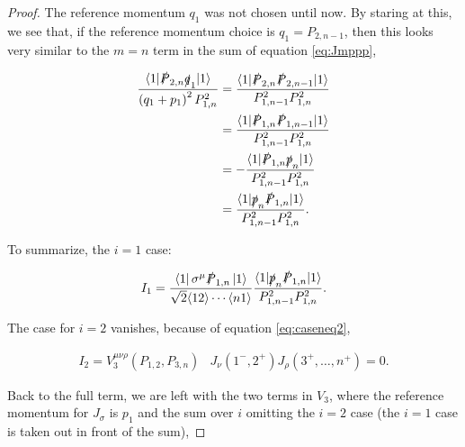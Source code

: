 \documentclass{article}
\theoremstyle{definition}
\numberwithin{equation}{section}
\begin{document}
\begin{proof}
    The reference momentum $q_1$ was not chosen until now. By staring at this, we see that, if the reference momentum choice is $q_1 = P_{2,n-1}$, then this looks very similar to the $m=n$ term in the sum of equation \eqref{eq:Jmppp},

    \begin{align*}
        \frac{ \langle 1 | \slashed{P}_{2,n} \slashed{q}_1 | 1 \rangle }{ \left( q_1 + p_1 \right)^2 P_{1,n}^2 } &= \frac{ \langle 1 | \slashed{P}_{2,n} \slashed{P}_{2,n-1} | 1 \rangle }{ P_{1,n-1}^2 P_{1,n}^2 } \\
        &= \frac{ \langle 1 | \slashed{P}_{1,n} \slashed{P}_{1,n-1} | 1 \rangle }{ P_{1,n-1}^2 P_{1,n}^2 } \\
        &= - \frac{ \langle 1 | \slashed{P}_{1,n} \slashed{p}_{n} | 1 \rangle }{ P_{1,n-1}^2 P_{1,n}^2 } \\
        &= \frac{ \langle 1 | \slashed{p}_{n} \slashed{P}_{1,n} | 1 \rangle }{ P_{1,n-1}^2 P_{1,n}^2 }.
    \end{align*}

    To summarize, the $i=1$ case:

    \begin{align}
        I_1 = \frac{ \bra{1} \sigma^{\mu} \slashed{P}_{1,n} \ket{1} }{ \sqrt{2} \langle 12 \rangle \cdots \langle n1 \rangle } \frac{ \langle 1 | \slashed{p}_{n} \slashed{P}_{1,n} | 1 \rangle }{ P_{1,n-1}^2 P_{1,n}^2 }. \label{eq:I1}
    \end{align}

    The case for $i=2$ vanishes, because of equation \eqref{eq:caseneq2},

    \begin{align*}
        I_2 = V_3^{\mu \nu \rho}(P_{1,2}, P_{3,n}) &J_{\nu}(1^{-}, 2^{+}) J_{\rho}(3^{+}, \dots , n^{+})  = 0.
    \end{align*}

    Back to the full term, we are left with the two terms in $V_3$, where the reference momentum for $J_{\sigma}$ is $p_1$ and the sum over $i$ omitting the $i=2$ case (the $i=1$ case is taken out in front of the sum),


\end{proof}
\end{document}
